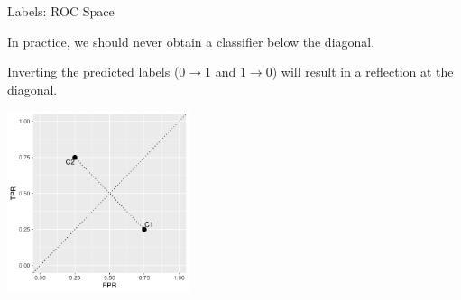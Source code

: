 \documentclass[11pt,compress,t,notes=noshow, xcolor=table]{beamer}
\newenvironment{knitrout}{}{} %
\begin{document}
\begin{vbframe}{Labels: ROC Space}

In practice, we should never obtain a classifier below the diagonal.\\

\lz

Inverting the predicted labels ($0 \rightarrow 1$ and $1 \rightarrow 0$) will result in a reflection at the diagonal. 

\lz

\begin{knitrout}\scriptsize
{}\color{fgcolor}

{\centering \includegraphics[width=0.4\textwidth]{figure/eval_mclass_roc_sp_3} 

}



\end{knitrout}
\end{vbframe}
\end{document}
